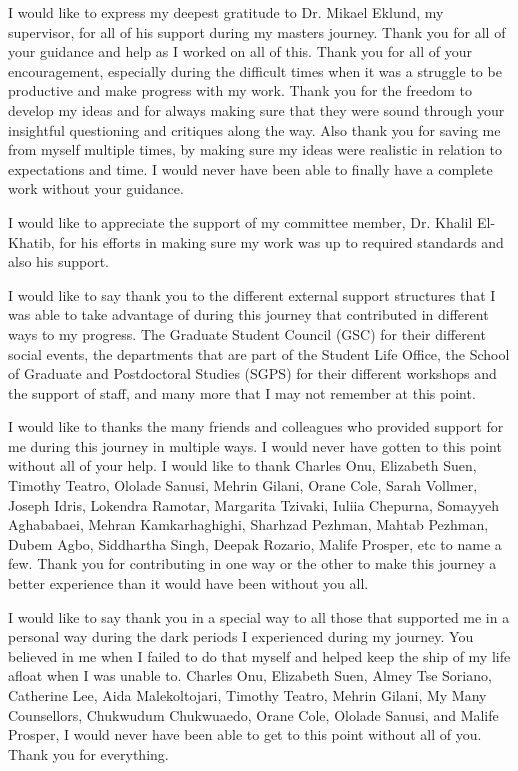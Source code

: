 \begin{acknowledgements}
\addchaptertocentry{\acknowledgementname} %

I would like to express my deepest gratitude to Dr. Mikael Eklund, my supervisor, for all of his support during my masters journey. Thank you for all of your guidance and  help as I worked on all of this. Thank you for all of your encouragement, especially during the difficult times when it was a struggle to be productive and make progress with my work. Thank you for the freedom to develop my ideas and for always making sure that they were sound through your insightful questioning and critiques along the way. Also thank you for saving me from myself multiple times, by making sure my ideas were realistic in relation to expectations and time. I would never have been able to finally have a complete work without your guidance.

I would like to appreciate the support of my committee member, Dr. Khalil El-Khatib, for his  efforts in making sure my work was up to required standards and also his support.

I would like to say thank you to the different external support structures that I was able to take advantage of during this journey that contributed in different ways to my progress. The Graduate Student Council (GSC) for their different social events, the departments that are part of the Student Life Office, the School of Graduate and Postdoctoral Studies (SGPS) for their different workshops and the support of staff, and many more that I may not remember at this point.

I would like to thanks the many friends and colleagues who provided support for me during this journey in multiple ways. I would never have gotten to this point without all of your help. I would like to thank Charles Onu, Elizabeth Suen, Timothy Teatro, Ololade Sanusi, Mehrin Gilani, Orane Cole, Sarah Vollmer, Joseph Idris, Lokendra Ramotar, Margarita Tzivaki, Iuliia Chepurna, Somayyeh Aghababaei, Mehran Kamkarhaghighi, Sharhzad Pezhman, Mahtab Pezhman, Dubem Agbo, Siddhartha Singh, Deepak Rozario, Malife Prosper, etc to name a few. Thank you for contributing in one way or the other to make this journey a better experience than it would have been without you all.

I would like to say thank you in a special way to all those that supported me in a personal way during the dark periods I experienced during my journey. You believed in me when I failed to do that myself and helped keep the ship of my life afloat when I was unable to. Charles Onu, Elizabeth Suen, Almey Tse Soriano, Catherine Lee, Aida Malekoltojari, Timothy Teatro, Mehrin Gilani, My Many Counsellors, Chukwudum Chukwuaedo, Orane Cole, Ololade Sanusi, and Malife Prosper, I would never have been able to get to this point without all of you. Thank you for everything.


\end{acknowledgements}
